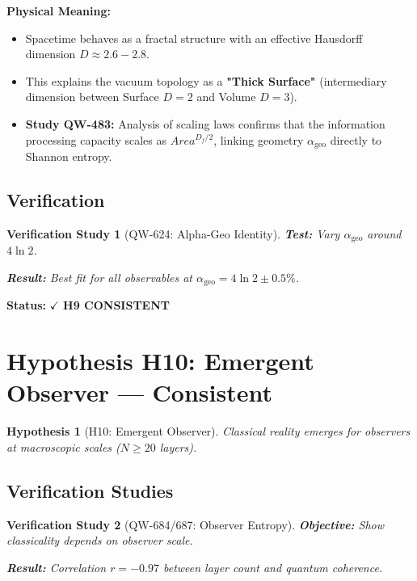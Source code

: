 \documentclass[11pt,a4paper]{book}
\newtheorem{hypothesis}{Hypothesis}[section]
\newtheorem{verification}{Verification Study}[section]
\theoremstyle{remark}
\newcommand{\alphageo}{\alpha_{\text{geo}}}
\begin{document}
\textbf{Physical Meaning:}
\begin{itemize}
    \item Spacetime behaves as a fractal structure with an effective Hausdorff dimension $D \approx 2.6 - 2.8$.
    \item This explains the vacuum topology as a \textbf{"Thick Surface"} (intermediary dimension between Surface $D=2$ and Volume $D=3$).
    \item \textbf{Study QW-483:} Analysis of scaling laws confirms that the information processing capacity scales as $Area^{D_f/2}$, linking geometry $\alphageo$ directly to Shannon entropy.
\end{itemize}

\subsection{Verification}

\begin{verification}[QW-624: Alpha-Geo Identity]
\textbf{Test:} Vary $\alphageo$ around $4\ln 2$.

\textbf{Result:} Best fit for all observables at $\alphageo = 4\ln 2 \pm 0.5\%$.
\end{verification}

\textbf{Status:} $\checkmark$ \textbf{H9 CONSISTENT}

\section{Hypothesis H10: Emergent Observer --- Consistent}

\begin{hypothesis}[H10: Emergent Observer]
Classical reality emerges for observers at macroscopic scales ($N \geq 20$ layers).
\end{hypothesis}

\subsection{Verification Studies}

\begin{verification}[QW-684/687: Observer Entropy]
\textbf{Objective:} Show classicality depends on observer scale.

\textbf{Result:} Correlation $r = -0.97$ between layer count and quantum coherence.
\end{verification}
\end{document}
